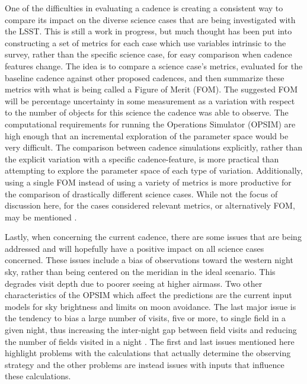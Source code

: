 \documentclass[12pt]{article}
\begin{document}
One of the difficulties in evaluating a cadence is creating a consistent way to compare its impact on the diverse science cases that are being investigated with the LSST. This is still a work in progress, but much thought has been put into constructing a set of metrics for each case which use variables intrinsic to the survey, rather than the specific science case, for easy comparison when cadence features change. The idea is to compare a science case's metrics, evaluated for the baseline cadence against other proposed cadences, and then summarize these metrics with what is being called a Figure of Merit (FOM). The suggested FOM will be percentage uncertainty in some measurement as a variation with respect to the number of objects for this science the cadence was able to observe.  The computational requirements for running the Operations Simulator (OPSIM) are high enough that an incremental exploration of the parameter space would be very difficult. The comparison between cadence simulations explicitly, rather than the explicit variation with a specific cadence-feature, is more practical than attempting to explore the parameter space of each type of variation. Additionally, using a single FOM instead of using a variety of metrics is more productive for the comparison of drastically different science cases. While not the focus of discussion here, for the cases considered relevant metrics, or alternatively FOM, may be mentioned \citep{LSSTScienceCollaboration2017}. \par
Lastly, when concerning the current cadence, there are some issues that are being addressed and will hopefully have a positive impact on all science cases concerned. These issues include a bias of observations toward the western night sky, rather than being centered on the meridian in the ideal scenario. This degrades visit depth due to poorer seeing at higher airmass. Two other characteristics of the OPSIM which affect the predictions are the current input models for sky brightness and limits on moon avoidance. The last major issue is the tendency to bias a large number of visits, five or more, to single field in a given night, thus increasing the inter-night gap between field visits and reducing the number of fields visited in a night \citep{LSSTScienceCollaboration2017}. The first and last issues mentioned here highlight problems with the calculations that actually determine the observing strategy and the other problems are instead issues with inputs that influence these calculations.  \par
\end{document}
